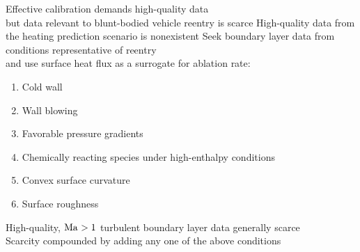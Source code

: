 \documentclass[mathserif]{beamer}
\begin{document}

\begin{frame}{Effective calibration demands high-quality data\\
              but data relevant to blunt-bodied vehicle reentry is scarce}
%
High-quality data from the heating prediction scenario is nonexistent
\vfill
Seek boundary layer data from conditions representative of reentry\\
and use surface heat flux as a surrogate for ablation rate:
\begin{enumerate}
 \item Cold wall
 \item Wall blowing
 \item Favorable pressure gradients
 \item Chemically reacting species under high-enthalpy conditions
 \item Convex surface curvature
 \item Surface roughness
\end{enumerate}
\vfill
High-quality, $\mbox{Ma}_{}>1$ turbulent boundary layer data generally scarce\\
Scarcity compounded by adding any one of the above conditions
\end{frame}
\end{document}
